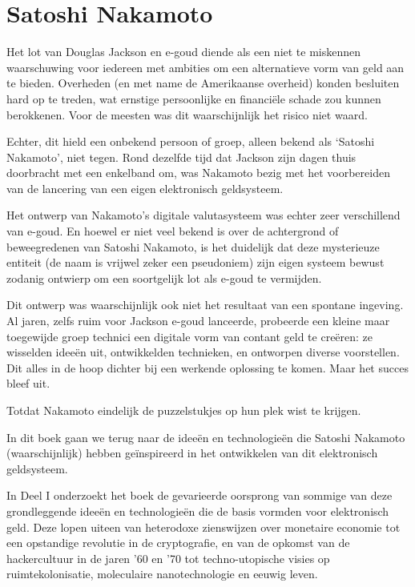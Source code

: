 \documentclass[smalldemyvopaper,11pt,twoside,onecolumn,openright,extrafontsizes,hidelinks]{memoir}
\begin{document}
\section*{Satoshi Nakamoto}\label{satoshi-nakamoto}


Het lot van Douglas Jackson en e-goud diende als een niet te miskennen
waarschuwing voor iedereen met ambities om een alternatieve vorm van
geld aan te bieden. Overheden (en met name de Amerikaanse overheid)
konden besluiten hard op te treden, wat ernstige persoonlijke en
financiële schade zou kunnen berokkenen. Voor de meesten was dit
waarschijnlijk het risico niet waard.

Echter, dit hield een onbekend persoon of groep, alleen bekend als
`Satoshi Nakamoto', niet tegen. Rond dezelfde tijd dat Jackson zijn
dagen thuis doorbracht met een enkelband om, was Nakamoto bezig met het
voorbereiden van de lancering van een eigen elektronisch geldsysteem.

Het ontwerp van Nakamoto's digitale valutasysteem was echter zeer
verschillend van e-goud. En hoewel er niet veel bekend is over de
achtergrond of beweegredenen van Satoshi Nakamoto, is het duidelijk dat
deze mysterieuze entiteit (de naam is vrijwel zeker een pseudoniem) zijn
eigen systeem bewust zodanig ontwierp om een soortgelijk lot als e-goud
te vermijden.

Dit ontwerp was waarschijnlijk ook niet het resultaat van een spontane
ingeving. Al jaren, zelfs ruim voor Jackson e-goud lanceerde, probeerde
een kleine maar toegewijde groep technici een digitale vorm van contant
geld te creëren: ze wisselden ideeën uit, ontwikkelden technieken, en
ontworpen diverse voorstellen. Dit alles in de hoop dichter bij een
werkende oplossing te komen. Maar het succes bleef uit.

Totdat Nakamoto eindelijk de puzzelstukjes op hun plek wist te krijgen.

In dit boek gaan we terug naar de ideeën en technologieën die Satoshi
Nakamoto (waarschijnlijk) hebben geïnspireerd in het ontwikkelen van dit
elektronisch geldsysteem.

In Deel I onderzoekt het boek de gevarieerde oorsprong van sommige van
deze grondleggende ideeën en technologieën die de basis vormden voor
elektronisch geld. Deze lopen uiteen van heterodoxe zienswijzen over
monetaire economie tot een opstandige revolutie in de cryptografie, en
van de opkomst van de hackercultuur in de jaren '60 en '70 tot
techno-utopische visies op ruimtekolonisatie, moleculaire
nanotechnologie en eeuwig leven.
\end{document}
